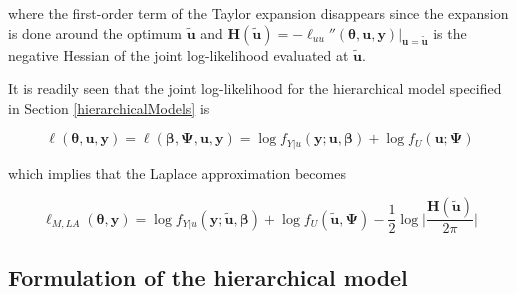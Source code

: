 \documentclass[a4paper,twoside,11pt]{report} %
\theoremstyle{definition}
\theoremstyle{definition}
\theoremstyle{definition}
\theoremstyle{definition}
\theoremstyle{remark}
\begin{document}
where the first-order term of the Taylor expansion disappears since the expansion is done around the optimum \(\boldsymbol{\tilde {u}}\) and \(\boldsymbol{H}(\boldsymbol{\tilde{u}})=-\ell_{uu}''(\boldsymbol{\theta, u, y})|_{\boldsymbol{u=\tilde{u}}}\) is the negative Hessian of the joint log-likelihood evaluated at \(\boldsymbol{\tilde{u}}\).

It is readily seen that the joint log-likelihood for the hierarchical model specified in Section \ref{hierarchicalModels} is

\begin{equation}
  \ell(\boldsymbol{\theta, u, y}) = \ell(\boldsymbol{\beta, \Psi, u, y}) = \log f_{Y|u}(\boldsymbol{y;u,\beta})+\log f_U(\boldsymbol{u;\Psi})
\end{equation}

which implies that the Laplace approximation becomes

\begin{equation}
  \ell_{M,LA}(\boldsymbol{\theta, y})=\log f_{Y|u}(\boldsymbol{y; \tilde{u},\beta})+\log f_U(\boldsymbol{\tilde{u}, \Psi})-\frac{1}{2}\log\Bigg|\frac{\boldsymbol{H}(\boldsymbol{\tilde{u}})}{2\pi}\Bigg|
\end{equation}

\subsection{Formulation of the hierarchical model}
\end{document}
